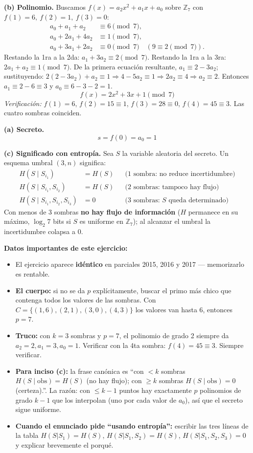 \documentclass[11pt,a4paper]{article}
\begin{document}
\textbf{(b) Polinomio.} Buscamos $f(x)=a_2x^2+a_1x+a_0$ sobre $\mathbb{Z}_7$ con $f(1)=6,\ f(2)=1,\ f(3)=0$:
\begin{align*}
  a_0+a_1+a_2 &\equiv 6 \pmod 7,\\
  a_0+2a_1+4a_2 &\equiv 1 \pmod 7,\\
  a_0+3a_1+2a_2 &\equiv 0 \pmod 7 \quad (9\equiv 2 \pmod 7).
\end{align*}
Restando la 1ra a la 2da: $a_1+3a_2\equiv 2 \pmod 7$. Restando la 1ra a la 3ra: $2a_1+a_2\equiv 1 \pmod 7$. De la primera ecuación resultante, $a_1\equiv 2-3a_2$; sustituyendo: $2(2-3a_2)+a_2\equiv 1 \Rightarrow 4-5a_2\equiv 1 \Rightarrow 2a_2\equiv 4 \Rightarrow a_2\equiv 2$. Entonces $a_1\equiv 2-6\equiv 3$ y $a_0\equiv 6-3-2 = 1$.
\[
  \boxed{f(x) = 2x^2 + 3x + 1 \pmod 7}
\]
\emph{Verificación:} $f(1)=6$, $f(2)=15\equiv 1$, $f(3)=28\equiv 0$, $f(4)=45\equiv 3$. Las cuatro sombras coinciden.

\textbf{(a) Secreto.}
\[
  s = f(0) = a_0 = \boxed{1}
\]

\textbf{(c) Significado con entropía.} Sea $S$ la variable aleatoria del secreto. Un esquema umbral $(3,n)$ significa:
\begin{align*}
  H(S \mid S_{i_1}) &= H(S) & &\text{(1 sombra: no reduce incertidumbre)}\\
  H(S \mid S_{i_1}, S_{i_2}) &= H(S) & &\text{(2 sombras: tampoco hay flujo)}\\
  H(S \mid S_{i_1}, S_{i_2}, S_{i_3}) &= 0 & &\text{(3 sombras: $S$ queda determinado)}
\end{align*}
Con menos de 3 sombras \textbf{no hay flujo de información} ($H$ permanece en su máximo, $\log_2 7$ bits si $S$ es uniforme en $\mathbb{Z}_7$); al alcanzar el umbral la incertidumbre colapsa a 0.

\begin{tipsbox}
\textbf{Datos importantes de este ejercicio:}
\begin{itemize}
  \item El ejercicio aparece \textbf{idéntico} en parciales 2015, 2016 y 2017 --- memorizarlo es rentable.
  \item \textbf{El cuerpo:} si no se da $p$ explícitamente, buscar el primo más chico que contenga todos los valores de las sombras. Con $C=\{(1,6),(2,1),(3,0),(4,3)\}$ los valores van hasta 6, entonces $p=7$.
  \item \textbf{Truco:} con $k=3$ sombras y $p=7$, el polinomio de grado 2 siempre da $a_2=2, a_1=3, a_0=1$. Verificar con la 4ta sombra: $f(4)=45\equiv 3$. Siempre verificar.
  \item \textbf{Para inciso (c):} la frase canónica es ``con $<k$ sombras $H(S\mid\text{obs})=H(S)$ (no hay flujo); con $\ge k$ sombras $H(S\mid\text{obs})=0$ (certeza).''. La razón: con $\le k-1$ puntos hay exactamente $p$ polinomios de grado $k-1$ que los interpolan (uno por cada valor de $a_0$), así que el secreto sigue uniforme.
  \item \textbf{Cuando el enunciado pide ``usando entropía'':} escribir las tres líneas de la tabla $H(S|S_1)=H(S)$, $H(S|S_1,S_2)=H(S)$, $H(S|S_1,S_2,S_3)=0$ y explicar brevemente el porqué.
\end{itemize}
\end{tipsbox}
\end{document}
